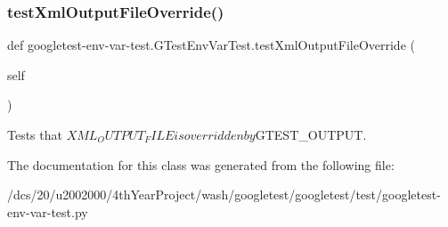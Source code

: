 \subsubsection{\texorpdfstring{test\+Xml\+Output\+File\+Override()}{testXmlOutputFileOverride()}}
{\footnotesize\ttfamily def googletest-\/env-\/var-\/test.\+G\+Test\+Env\+Var\+Test.\+test\+Xml\+Output\+File\+Override (\begin{DoxyParamCaption}\item[{}]{self }\end{DoxyParamCaption})}

\begin{DoxyVerb}Tests that $XML_OUTPUT_FILE is overridden by $GTEST_OUTPUT.\end{DoxyVerb}
 

The documentation for this class was generated from the following file\+:\begin{DoxyCompactItemize}
\item 
/dcs/20/u2002000/4th\+Year\+Project/wash/googletest/googletest/test/googletest-\/env-\/var-\/test.\+py\end{DoxyCompactItemize}
